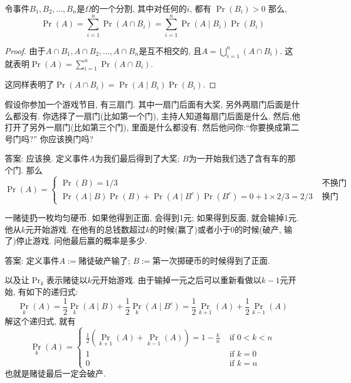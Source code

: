 \documentclass{ctexart}
\begin{document}
\begin{theorem}[全概率公式]
    令事件$B_1, B_2, ... , B_n$是$\Omega$的一个分割, 其中对任何的$i$, 都有
    $\operatorname{Pr}\left(B_i\right)>0$
    那么, 
    $$\operatorname{Pr}(A)=\sum_{i=1}^n \operatorname{Pr}\left(A \cap B_i\right)=\sum_{i=1}^n \operatorname{Pr}\left(A \mid B_i\right) \operatorname{Pr}\left(B_i\right)$$

\end{theorem}

\begin{proof}
    由于$A \cap B_1, A \cap B_2, \ldots, A \cap B_n$是互不相交的, 且$A=\bigcup_{i=1}^n\left(A \cap B_i\right)$. 这就表明$\operatorname{Pr}(A)=\sum_{i=1}^n \operatorname{Pr}\left(A \cap B_i\right)$. 

    这同样表明了$\operatorname{Pr}\left(A \cap B_i\right)=\operatorname{Pr}\left(A \mid B_i\right) \operatorname{Pr}\left(B_i\right)$.
\end{proof}

\begin{example}[三门问题]

    假设你参加一个游戏节目, 有三扇门.  其中一扇门后面有大奖, 另外两扇门后面是什么都没有.  你选择了一扇门(比如第一个门), 主持人知道每扇门后面是什么. 
然后,他打开了另外一扇门(比如第三个门), 里面是什么都没有. 然后他问你:``你要换成第二号门吗?'' 你应该换门吗?

答案: 应该换. 定义事件$A$为我们最后得到了大奖; $B$为一开始我们选了含有车的那个门. 那么
\[
    \operatorname{Pr}(A)= \begin{cases}\operatorname{Pr}(B)=1 / 3 & \text { 不换门 } \\ \operatorname{Pr}(A \mid B) \operatorname{Pr}(B)+\operatorname{Pr}\left(A \mid B^c\right) \operatorname{Pr}\left(B^c\right) =0+1\times 2/3=2/3& \text { 换门 }\end{cases}
\]
\end{example}

\begin{example}[赌徒破产问题]
    一赌徒扔一枚均匀硬币. 如果他得到正面, 会得到1元; 如果得到反面, 就会输掉1元. 他从$k$元开始游戏. 在他有的总钱数超过$k$的时候(赢了)或者小于0的时候(破产, 输了)停止游戏. 问他最后赢的概率是多少. 

    答案: 定义事件$A:=$赌徒破产输了; $B:=$第一次掷硬币的时候得到了正面.

    以及让$\Pr_k$表示赌徒以$k$元开始游戏. 由于输掉一元之后可以重新看做以$k-1$元开始, 有如下的递归式: 
    $$
\operatorname{Pr}_k(A)=\frac{1}{2} \operatorname{Pr}_k(A \mid B)+\frac{1}{2} \operatorname{Pr}_k\left(A \mid B^c\right)=\frac{1}{2} \operatorname{Pr}_{k+1}(A)+\frac{1}{2} \operatorname{Pr}_{k-1}(A)
$$
解这个递归式, 就有
$$
\operatorname{Pr}_k(A)= \begin{cases}\frac{1}{2}\left(\operatorname{Pr}_{k+1}(A)+\operatorname{Pr}_{k-1}(A)\right)=1-\frac{k}{n} & \text { if } 0<k<n \\ 1 & \text { if } k=0 \\ 0 & \text { if } k=n\end{cases}
$$
也就是赌徒最后一定会破产. 
\end{example}
\end{document}
